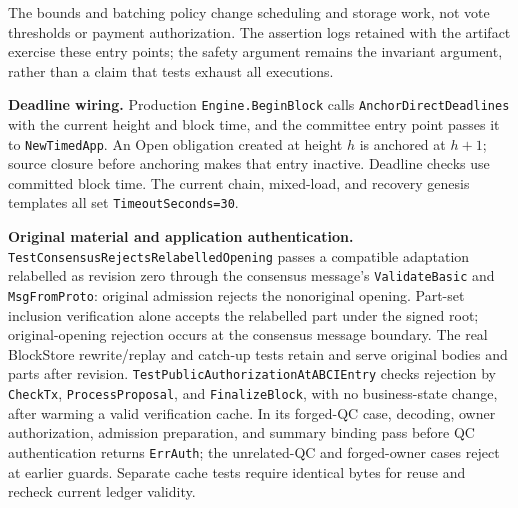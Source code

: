 The bounds and batching policy change scheduling and storage work, not vote thresholds or payment authorization. The assertion logs retained with the artifact exercise these entry points; the safety argument remains the invariant argument, rather than a claim that tests exhaust all executions.

\noindent\textbf{Deadline wiring.}
Production \texttt{Engine.BeginBlock} calls \texttt{AnchorDirectDeadlines} with the current height and block time, and the committee entry point passes it to \texttt{NewTimedApp}. An Open obligation created at height $h$ is anchored at $h+1$; source closure before anchoring makes that entry inactive. Deadline checks use committed block time. The current chain, mixed-load, and recovery genesis templates all set \texttt{TimeoutSeconds=30}.

\noindent\textbf{Original material and application authentication.}
\texttt{Test\allowbreak Consensus\allowbreak Rejects\allowbreak Relabelled\allowbreak Opening} passes a compatible adaptation
relabelled as revision zero through the consensus message's
\texttt{Validate\allowbreak Basic} and \texttt{Msg\allowbreak From\allowbreak Proto}: original admission rejects
the nonoriginal opening. Part-set inclusion verification alone accepts
the relabelled part under the signed root; original-opening rejection
occurs at the consensus message boundary. The real BlockStore rewrite/replay and catch-up
tests retain and serve original bodies and parts after revision.
\texttt{Test\allowbreak Public\allowbreak Authorization\allowbreak At\allowbreak ABCIEntry} checks rejection by
\texttt{CheckTx}, \texttt{ProcessProposal}, and \texttt{FinalizeBlock}, with
no business-state change, after warming a valid verification cache. In its
forged-QC case, decoding, owner authorization, admission preparation, and
summary binding pass before QC authentication returns \texttt{ErrAuth}; the
unrelated-QC and forged-owner cases reject at earlier guards. Separate cache
tests require identical bytes for reuse and recheck current ledger validity.

